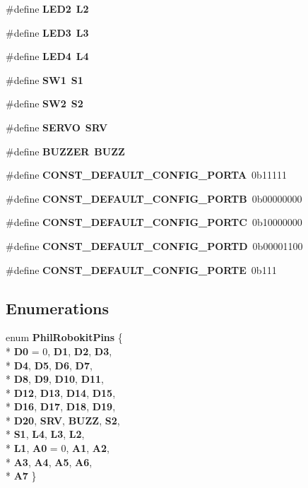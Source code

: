 \begin{DoxyCompactItemize}
\#define {\bf L\-E\-D2}~{\bf L2}
\item 
\#define {\bf L\-E\-D3}~{\bf L3}
\item 
\#define {\bf L\-E\-D4}~{\bf L4}
\item 
\#define {\bf S\-W1}~{\bf S1}
\item 
\#define {\bf S\-W2}~{\bf S2}
\item 
\#define {\bf S\-E\-R\-V\-O}~{\bf S\-R\-V}
\item 
\#define {\bf B\-U\-Z\-Z\-E\-R}~{\bf B\-U\-Z\-Z}
\item 
\#define {\bf C\-O\-N\-S\-T\-\_\-\-D\-E\-F\-A\-U\-L\-T\-\_\-\-C\-O\-N\-F\-I\-G\-\_\-\-P\-O\-R\-T\-A}~0b11111
\item 
\#define {\bf C\-O\-N\-S\-T\-\_\-\-D\-E\-F\-A\-U\-L\-T\-\_\-\-C\-O\-N\-F\-I\-G\-\_\-\-P\-O\-R\-T\-B}~0b00000000
\item 
\#define {\bf C\-O\-N\-S\-T\-\_\-\-D\-E\-F\-A\-U\-L\-T\-\_\-\-C\-O\-N\-F\-I\-G\-\_\-\-P\-O\-R\-T\-C}~0b10000000
\item 
\#define {\bf C\-O\-N\-S\-T\-\_\-\-D\-E\-F\-A\-U\-L\-T\-\_\-\-C\-O\-N\-F\-I\-G\-\_\-\-P\-O\-R\-T\-D}~0b00001100
\item 
\#define {\bf C\-O\-N\-S\-T\-\_\-\-D\-E\-F\-A\-U\-L\-T\-\_\-\-C\-O\-N\-F\-I\-G\-\_\-\-P\-O\-R\-T\-E}~0b111
\end{DoxyCompactItemize}
\subsection*{Enumerations}
\begin{DoxyCompactItemize}
\item 
enum {\bf Phil\-Robokit\-Pins} \{ \\*
{\bf D0} = 0, 
{\bf D1}, 
{\bf D2}, 
{\bf D3}, 
\\*
{\bf D4}, 
{\bf D5}, 
{\bf D6}, 
{\bf D7}, 
\\*
{\bf D8}, 
{\bf D9}, 
{\bf D10}, 
{\bf D11}, 
\\*
{\bf D12}, 
{\bf D13}, 
{\bf D14}, 
{\bf D15}, 
\\*
{\bf D16}, 
{\bf D17}, 
{\bf D18}, 
{\bf D19}, 
\\*
{\bf D20}, 
{\bf S\-R\-V}, 
{\bf B\-U\-Z\-Z}, 
{\bf S2}, 
\\*
{\bf S1}, 
{\bf L4}, 
{\bf L3}, 
{\bf L2}, 
\\*
{\bf L1}, 
{\bf A0} = 0, 
{\bf A1}, 
{\bf A2}, 
\\*
{\bf A3}, 
{\bf A4}, 
{\bf A5}, 
{\bf A6}, 
\\*
{\bf A7}
 \}
\end{DoxyCompactItemize}


